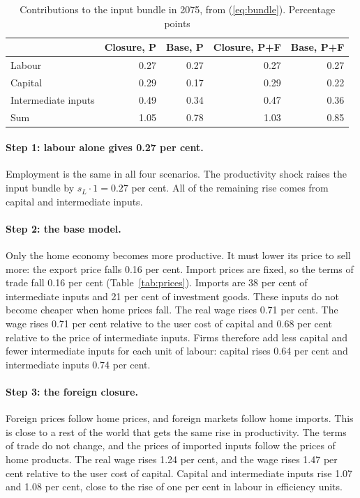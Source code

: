 \documentclass[11pt,a4paper]{article}
\begin{document}
\begin{table}[H]
\centering
\small
\caption{Contributions to the input bundle in 2075, from (\ref{eq:bundle}). Percentage points}
\label{tab:contributions}
\begin{tabular}{@{}lrrrr@{}}
\toprule
 & Closure, P & Base, P & Closure, P+F & Base, P+F \\
\midrule
Labour & 0.27 & 0.27 & 0.27 & 0.27 \\
Capital & 0.29 & 0.17 & 0.29 & 0.22 \\
Intermediate inputs & 0.49 & 0.34 & 0.47 & 0.36 \\
\midrule
Sum & 1.05 & 0.78 & 1.03 & 0.85 \\
\bottomrule
\end{tabular}
\end{table}

\paragraph{Step 1: labour alone gives 0.27 per cent.}
Employment is the same in all four scenarios. The productivity shock raises the input bundle by $s_L \cdot 1 = 0.27$ per cent. All of the remaining rise comes from capital and intermediate inputs.

\paragraph{Step 2: the base model.}
Only the home economy becomes more productive. It must lower its price to sell more: the export price falls 0.16 per cent. Import prices are fixed, so the terms of trade fall 0.16 per cent (Table~\ref{tab:prices}).
Imports are 38 per cent of intermediate inputs and 21 per cent of investment goods. These inputs do not become cheaper when home prices fall.
The real wage rises 0.71 per cent. The wage rises 0.71 per cent relative to the user cost of capital and 0.68 per cent relative to the price of intermediate inputs.
Firms therefore add less capital and fewer intermediate inputs for each unit of labour: capital rises 0.64 per cent and intermediate inputs 0.74 per cent.

\paragraph{Step 3: the foreign closure.}
Foreign prices follow home prices, and foreign markets follow home imports. This is close to a rest of the world that gets the same rise in productivity.
The terms of trade do not change, and the prices of imported inputs follow the prices of home products.
The real wage rises 1.24 per cent, and the wage rises 1.47 per cent relative to the user cost of capital.
Capital and intermediate inputs rise 1.07 and 1.08 per cent, close to the rise of one per cent in labour in efficiency units.
\end{document}
